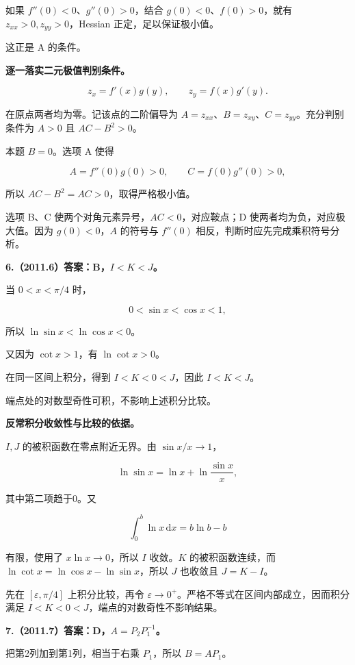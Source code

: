 \documentclass[UTF8,11pt,fontset=windows]{ctexart}
\begin{document}
如果 $f''(0)<0$、$g''(0)>0$，结合 $g(0)<0$、$f(0)>0$，就有 $z_{xx}>0,z_{yy}>0$，Hessian 正定，足以保证极小值。

这正是 A 的条件。

\textbf{逐一落实二元极值判别条件。}

$$
z_x=f'(x)g(y),\qquad z_y=f(x)g'(y).
$$

在原点两者均为零。记该点的二阶偏导为 $A=z_{xx}$、$B=z_{xy}$、$C=z_{yy}$。充分判别条件为 $A>0$ 且 $AC-B^2>0$。

本题 $B=0$。选项 A 使得

$$
A=f''(0)g(0)>0,\qquad C=f(0)g''(0)>0,
$$

所以 $AC-B^2=AC>0$，取得严格极小值。

选项 B、C 使两个对角元素异号，$AC<0$，对应鞍点；D 使两者均为负，对应极大值。因为 $g(0)<0$，$A$ 的符号与 $f''(0)$ 相反，判断时应先完成乘积符号分析。

\clearpage

\textbf{6.（2011.6）答案：B，$I<K<J$。}

当 $0<x<\pi/4$ 时，

$$
0<\sin x<\cos x<1,
$$

所以 $\ln\sin x<\ln\cos x<0$。

又因为 $\cot x>1$，有 $\ln\cot x>0$。

在同一区间上积分，得到 $I<K<0<J$，因此 $I<K<J$。

端点处的对数型奇性可积，不影响上述积分比较。

\textbf{反常积分收敛性与比较的依据。}

$I,J$ 的被积函数在零点附近无界。由 $\sin x/x\to1$，

$$
\ln\sin x=\ln x+\ln\frac{\sin x}{x},
$$

其中第二项趋于0。又

$$
\int_0^b\ln x\,\mathrm dx=b\ln b-b
$$

有限，使用了 $x\ln x\to0$，所以 $I$ 收敛。$K$ 的被积函数连续，而 $\ln\cot x=\ln\cos x-\ln\sin x$，所以 $J$ 也收敛且 $J=K-I$。

先在 $[\varepsilon,\pi/4]$ 上积分比较，再令 $\varepsilon\to0^+$。严格不等式在区间内部成立，因而积分满足 $I<K<0<J$，端点的对数奇性不影响结果。

\clearpage

\textbf{7.（2011.7）答案：D，$A=P_2P_1^{-1}$。}

把第2列加到第1列，相当于右乘 $P_1$，所以 $B=AP_1$。
\end{document}
